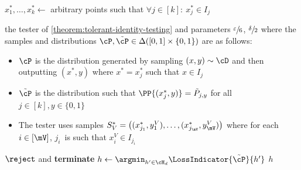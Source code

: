 \begin{minipage}{\textwidth}
\begin{protocol}[H]
\begin{ShadedAlgorithmBox}
\begin{algorithmic}
			\vsp

			\State $x_1^*,\dots,x_k^* \gets$ arbitrary points such that $\forall j \in [k]: ~ x_j^* \in I_j$

			\vsp

			 the tester of \cref{theorem:tolerant-identity-testing} and parameters $\sfrac{\varepsilon}{6}$, $\sfrac{\delta}{2}$ where the samples and distributions $\cP,\tilde{\cP} \in \Delta([0,1] \times \{0,1\})$ are as follows:
			\vsp
			\begin{itemize}
				\item[-]{
					$\cP$ is the distribution generated by sampling $(x,y) \sim \cD$ and then outputting $(x^*,y)$ where $x^* = x_j^*$ such that $x \in I_j$
				}
				\item[-]{
					$\tilde{\cP}$ is the distribution such that $\PP{(x_j^*,y)} = \tilde{P}_{j,y}$ for all $j \in [k],y \in \{0,1\}$
				}
				\item[-]{
					The tester uses samples $S_V^* = 
					\left(
						(x_{j_1}^*,y_1^V),
						\dots,
						(x_{j_{\mV}}^*,y_{\mV}^V)
					\right)$ 
					where for each $i \in [\mV]$, $j_i$~is such that $x_{i}^V \in I_{j_i}$
				}
			\end{itemize}
			\vspp
				 $\reject$ and {\bfseries terminate} 
			\EndIf
			\vsp
			\State $h \gets \argmin_{h' \in \cH_d} \LossIndicator{\tilde{\cP}}{h'}$
			\vsp
			 $h$  
			
		\end{algorithmic}	
	\end{ShadedAlgorithmBox}
	\caption{Verification protocol for unions of $d$-intervals.}
	\label{protocol:union-of-intervals}
\end{protocol}
\end{minipage}
	
